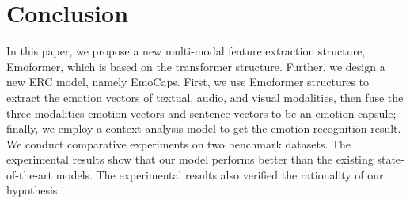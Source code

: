 \section{Conclusion}
In this paper, we propose a new multi-modal feature extraction structure, Emoformer, which is based on the transformer structure. Further, we design a new ERC model, namely EmoCaps. First, we use Emoformer structures to extract the emotion vectors of textual, audio, and visual modalities, then fuse the three modalities emotion vectors and sentence vectors to be an emotion capsule; finally, we employ a context analysis model to get the emotion recognition result. We conduct comparative experiments on two benchmark datasets. The experimental results show that our model performs better than the existing state-of-the-art models. The experimental results also verified the rationality of our hypothesis.

